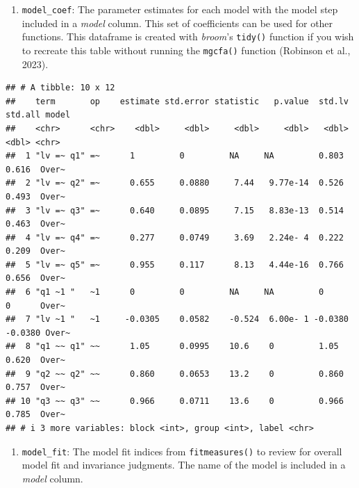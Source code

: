 \documentclass[
  man]{apa7}
\newenvironment{Shaded}{\begin{snugshade}}{\end{snugshade}}
\newcommand{\DecValTok}[1]{\textcolor[rgb]{0.00,0.00,0.81}{#1}}
\newcommand{\NormalTok}[1]{#1}
\newcommand{\SpecialCharTok}[1]{\textcolor[rgb]{0.81,0.36,0.00}{\textbf{#1}}}
\providecommand{\tightlist}{%
  \setlength{\itemsep}{0pt}\setlength{\parskip}{0pt}}
\begin{document}
\begin{enumerate}
\def\labelenumi{\arabic{enumi})}
\tightlist
\item
  \texttt{model\_coef}: The parameter estimates for each model with the model step included in a \emph{model} column. This set of coefficients can be used for other functions. This dataframe is created with \emph{broom}'s \texttt{tidy()} function if you wish to recreate this table without running the \texttt{mgcfa()} function (Robinson et al., 2023).
\end{enumerate}

\small

\begin{Shaded}
\end{Shaded}

\normalsize

\begin{verbatim}
## # A tibble: 10 x 12
##    term       op    estimate std.error statistic   p.value  std.lv std.all model
##    <chr>      <chr>    <dbl>     <dbl>     <dbl>     <dbl>   <dbl>   <dbl> <chr>
##  1 "lv =~ q1" =~      1         0         NA     NA         0.803   0.616  Over~
##  2 "lv =~ q2" =~      0.655     0.0880     7.44   9.77e-14  0.526   0.493  Over~
##  3 "lv =~ q3" =~      0.640     0.0895     7.15   8.83e-13  0.514   0.463  Over~
##  4 "lv =~ q4" =~      0.277     0.0749     3.69   2.24e- 4  0.222   0.209  Over~
##  5 "lv =~ q5" =~      0.955     0.117      8.13   4.44e-16  0.766   0.656  Over~
##  6 "q1 ~1 "   ~1      0         0         NA     NA         0       0      Over~
##  7 "lv ~1 "   ~1     -0.0305    0.0582    -0.524  6.00e- 1 -0.0380 -0.0380 Over~
##  8 "q1 ~~ q1" ~~      1.05      0.0995    10.6    0         1.05    0.620  Over~
##  9 "q2 ~~ q2" ~~      0.860     0.0653    13.2    0         0.860   0.757  Over~
## 10 "q3 ~~ q3" ~~      0.966     0.0711    13.6    0         0.966   0.785  Over~
## # i 3 more variables: block <int>, group <int>, label <chr>
\end{verbatim}

\begin{enumerate}
\def\labelenumi{\arabic{enumi})}
\setcounter{enumi}{1}
\tightlist
\item
  \texttt{model\_fit}: The model fit indices from \texttt{fitmeasures()} to review for overall model fit and invariance judgments. The name of the model is included in a \emph{model} column.
\end{enumerate}
\end{document}
